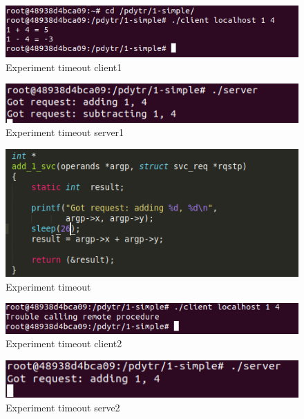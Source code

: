 \documentclass[12pt,journal,compsoc]{IEEEtran}
\begin{document}
\begin{figure}[H]
\centering
\includegraphics[width=125mm]{capturas/experiment-timeout25-client.png}
\caption{Experiment timeout client1}
\label{fig:experiment-timeout-25-client}
\end{figure}

\begin{figure}[H]
\centering
\includegraphics[width=125mm]{capturas/experiment-timeout25-server.png}
\caption{Experiment timeout server1}
\label{fig:experiment-timeout-25-server}
\end{figure}

\begin{figure}[H]
\centering
\includegraphics[width=125mm]{capturas/experiment-timeout26.png}
\caption{Experiment timeout}
\label{fig:experiment-timeout-26}
\end{figure}

\begin{figure}[H]
\centering
\includegraphics[width=125mm]{capturas/experiment-timeout26-client.png}
\caption{Experiment timeout client2}
\label{fig:experiment-timeout-26-client}
\end{figure}

\begin{figure}[H]
\centering
\includegraphics[width=125mm]{capturas/experiment-timeout26-server.png}
\caption{Experiment timeout serve2}
\label{fig:experiment-timeout-26-server}
\end{figure}

\ifCLASSOPTIONcaptionsoff
  \newpage
\fi
\end{document}
